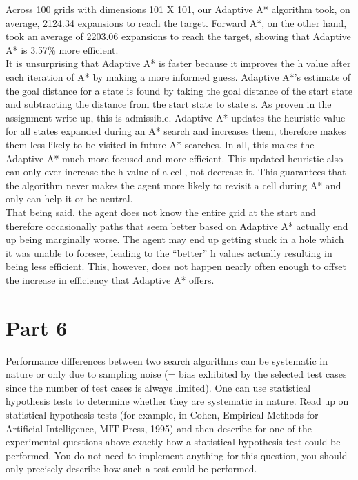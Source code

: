 \documentclass[12pt]{article}
\begin{document}
\begin{flushleft}
\hspace {1em}
Across 100 grids with dimensions 101 X 101, our Adaptive A* algorithm took, on
average, 2124.34 expansions to reach the target. Forward A*, on the other hand, took an
average of 2203.06 expansions to reach the target, showing that Adaptive A* is 3.57\% more
efficient.
\\
\hspace {1em}
It is unsurprising that Adaptive A* is faster because it improves the h value after each
iteration of A* by making a more informed guess. Adaptive A*’s estimate of the goal distance for
a state is found by taking the goal distance of the start state and subtracting the distance from
the start state to state s. As proven in the assignment write-up, this is admissible. Adaptive A*
updates the heuristic value for all states expanded during an A* search and increases them,
therefore makes them less likely to be visited in future A* searches. In all, this makes the
Adaptive A* much more focused and more efficient. This updated heuristic also can only ever
increase the h value of a cell, not decrease it. This guarantees that the algorithm never makes
the agent more likely to revisit a cell during A* and only can help it or be neutral.
\\
\hspace {1em}
That being said, the agent does not know the entire grid at the start and therefore
occasionally paths that seem better based on Adaptive A* actually end up being marginally
worse. The agent may end up getting stuck in a hole which it was unable to foresee, leading to
the “better” h values actually resulting in being less efficient. This, however, does not happen
nearly often enough to offset the increase in efficiency that Adaptive A* offers.

\end{flushleft}

\section*{Part 6}
\begin{itshape}
Performance differences between two search algorithms can be systematic in nature or only due to sampling noise (= bias exhibited by the selected test cases since the number of test cases is always limited). One can use statistical hypothesis tests to determine whether they are systematic in nature. Read up on statistical hypothesis tests (for example, in Cohen, Empirical Methods for Artificial Intelligence, MIT Press, 1995) and then describe for one of the experimental questions above exactly how a statistical hypothesis test could be performed. You do not need
to implement anything for this question, you should only precisely describe how such a test could be performed.
\end{itshape}
\end{document}
